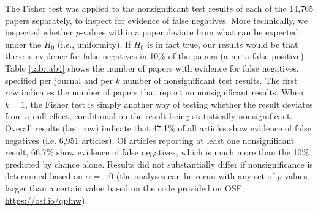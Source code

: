 \documentclass{article}
\begin{document}
The Fisher test was applied to the nonsignificant test results of each of the 14,765 papers separately, to inspect for evidence of false negatives. More technically, we inspected whether $p$-values within a paper deviate from what can be expected under the $H_0$ (i.e., uniformity). If $H_0$ is in fact true, our results would be that there is evidence for false negatives in 10\% of the papers (a meta-false positive). Table \ref{tab:tab4} shows the number of papers with evidence for false negatives, specified per journal and per $k$ number of nonsignificant test results. The first row indicates the number of papers that report no nonsignificant results. When $k=1$, the Fisher test is simply another way of testing whether the result deviates from a null effect, conditional on the result being statistically nonsignificant. Overall results (last row) indicate that 47.1\% of all articles show evidence of false negatives (i.e. 6,951 articles). Of articles reporting at least one nonsignificant result, 66.7\% show evidence of false negatives, which is much more than the 10\% predicted by chance alone. Results did not substantially differ if nonsignificance is determined based on $\alpha=.10$ (the analyses can be rerun with any set of $p$-values larger than a certain value based on the code provided on OSF; \url{https://osf.io/qpfnw}).
\end{document}
